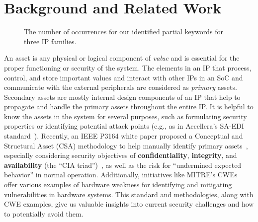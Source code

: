\section{Background and Related Work\label{sec:background}}

\begin{figure*}[t]
\centering
{}\hfill
{}\hfill
{}
\caption{The number of occurrences for our identified partial keywords for three IP families.\label{fig:explanations_of_general_image}
}
\end{figure*}


An asset is any physical or logical component of \textit{value} and is essential for the proper functioning or security of the system\cite{holdings2009arm}.
The elements in an \ac{IP} that process, control, and store important values and interact with other \acp{IP} in an \ac{SoC} and communicate with the external peripherals are considered as \textit{primary} assets. 
Secondary assets are mostly internal design components of an \ac{IP} that help to propagate and handle the primary assets throughout the entire \ac{IP}.
It is helpful to know the assets in the system for several purposes, such as formulating security properties or identifying potential attack points (e.g., as in Accellera's \ac{SA-EDI} standard~\cite{accellera}). 
Recently, an IEEE P3164 white paper proposed a Conceptual and Structural Asset (CSA) methodology to help manually identify primary assets~\cite{ieee_p3164_working_group_asset_2024}, especially considering security objectives of \textbf{confidentiality}, \textbf{integrity}, and \textbf{availability} (the ``CIA triad'')~\cite{noauthor_what_nodate}, as well as the risk for ``undermined expected behavior'' in normal operation. 
Additionally, initiatives like MITRE's \acp{CWE}~\cite{mitreCommonWeakness} offer various examples of hardware weakness for identifying and mitigating vulnerabilities in hardware systems. 
This standard and methodologies, along with \ac{CWE} examples, give us valuable insights into current security challenges and how to potentially avoid them. 

